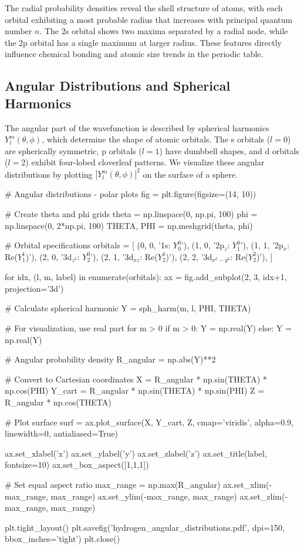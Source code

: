 \documentclass[11pt,a4paper]{article}
\begin{document}
The radial probability densities reveal the shell structure of atoms, with each orbital exhibiting a most probable radius that increases with principal quantum number $n$. The 2s orbital shows two maxima separated by a radial node, while the 2p orbital has a single maximum at larger radius. These features directly influence chemical bonding and atomic size trends in the periodic table.

\subsection{Angular Distributions and Spherical Harmonics}

The angular part of the wavefunction is described by spherical harmonics $Y_l^m(\theta,\phi)$, which determine the shape of atomic orbitals. The s orbitals ($l=0$) are spherically symmetric, p orbitals ($l=1$) have dumbbell shapes, and d orbitals ($l=2$) exhibit four-lobed cloverleaf patterns. We visualize these angular distributions by plotting $|Y_l^m(\theta,\phi)|^2$ on the surface of a sphere.

\begin{pycode}
# Angular distributions - polar plots
fig = plt.figure(figsize=(14, 10))

# Create theta and phi grids
theta = np.linspace(0, np.pi, 100)
phi = np.linspace(0, 2*np.pi, 100)
THETA, PHI = np.meshgrid(theta, phi)

# Orbital specifications
orbitals = [
    (0, 0, '1s: $Y_0^0$'),
    (1, 0, '2p$_z$: $Y_1^0$'),
    (1, 1, '2p$_x$: Re($Y_1^1$)'),
    (2, 0, '3d$_{z^2}$: $Y_2^0$'),
    (2, 1, '3d$_{xz}$: Re($Y_2^1$)'),
    (2, 2, '3d$_{x^2-y^2}$: Re($Y_2^2$)'),
]

for idx, (l, m, label) in enumerate(orbitals):
    ax = fig.add_subplot(2, 3, idx+1, projection='3d')

    # Calculate spherical harmonic
    Y = sph_harm(m, l, PHI, THETA)

    # For visualization, use real part for m > 0
    if m > 0:
        Y = np.real(Y)
    else:
        Y = np.real(Y)

    # Angular probability density
    R_angular = np.abs(Y)**2

    # Convert to Cartesian coordinates
    X = R_angular * np.sin(THETA) * np.cos(PHI)
    Y_cart = R_angular * np.sin(THETA) * np.sin(PHI)
    Z = R_angular * np.cos(THETA)

    # Plot surface
    surf = ax.plot_surface(X, Y_cart, Z, cmap='viridis', alpha=0.9,
                          linewidth=0, antialiased=True)

    ax.set_xlabel('x')
    ax.set_ylabel('y')
    ax.set_zlabel('z')
    ax.set_title(label, fontsize=10)
    ax.set_box_aspect([1,1,1])

    # Set equal aspect ratio
    max_range = np.max(R_angular)
    ax.set_xlim(-max_range, max_range)
    ax.set_ylim(-max_range, max_range)
    ax.set_zlim(-max_range, max_range)

plt.tight_layout()
plt.savefig('hydrogen_angular_distributions.pdf', dpi=150, bbox_inches='tight')
plt.close()
\end{pycode}
\end{document}
